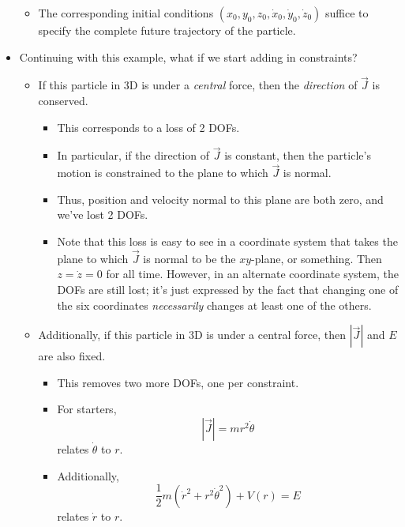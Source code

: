 \documentclass[../notes.tex]{subfiles}
\begin{document}
\begin{itemize}
\begin{itemize}
        \item The corresponding initial conditions $(x_0,y_0,z_0,\dot{x}_0,\dot{y}_0,\dot{z}_0)$ suffice to specify the complete future trajectory of the particle.
    \end{itemize}
    \item Continuing with this example, what if we start adding in constraints?
    \begin{itemize}
        \item If this particle in 3D is under a \emph{central} force, then the \emph{direction} of $\vec{J}$ is conserved.
        \begin{itemize}
            \item This corresponds to a loss of 2 DOFs.
            \item In particular, if the direction of $\vec{J}$ is constant, then the particle's motion is constrained to the plane to which $\vec{J}$ is normal.
            \item Thus, position and velocity normal to this plane are both zero, and we've lost 2 DOFs.
            \item Note that this loss is easy to see in a coordinate system that takes the plane to which $\vec{J}$ is normal to be the $xy$-plane, or something. Then $z=\dot{z}=0$ for all time. However, in an alternate coordinate system, the DOFs are still lost; it's just expressed by the fact that changing one of the six coordinates \emph{necessarily} changes at least one of the others.
        \end{itemize}
        \item Additionally, if this particle in 3D is under a central force, then $|\vec{J}|$ and $E$ are also fixed.
        \begin{itemize}
            \item This removes two more DOFs, one per constraint.
            \item For starters,
            \begin{equation*}
                |\vec{J}| = mr^2\dot{\theta}
            \end{equation*}
            relates $\dot{\theta}$ to $r$.
            \item Additionally,
            \begin{equation*}
                \frac{1}{2}m(\dot{r}^2+r^2\dot{\theta}^2)+V(r) = E
            \end{equation*}
            relates $\dot{r}$ to $r$.
        \end{itemize}

\end{itemize}
\end{itemize}
\end{document}
